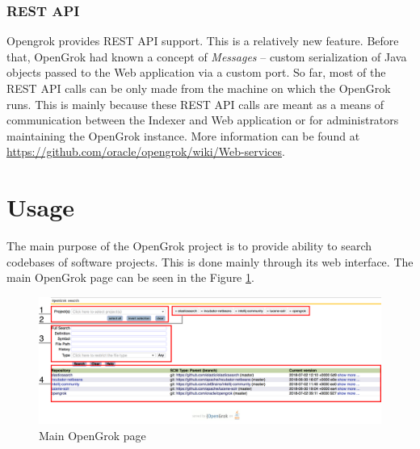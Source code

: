 \subsubsection{REST API}
\label{opengrok_rest}

Opengrok provides REST API support. This is a relatively new feature. Before that, OpenGrok had known a concept of
\textit{Messages} – custom serialization of Java objects passed to the Web application via a custom port.
So far, most of the REST API calls can be only made from the machine on which the OpenGrok runs.
This is mainly because these REST API calls are meant as a means of communication between the Indexer and Web application
or for administrators maintaining the OpenGrok instance. More information can be found at
\url{https://github.com/oracle/opengrok/wiki/Web-services}.

\section{Usage}
\label{opengrok_usage}
The main purpose of the OpenGrok project is to provide ability to search codebases of software projects. This is done
mainly through its web interface. The main OpenGrok page can be seen in the Figure \ref{opengrok_main}.

\begin{figure}[htbp]
    \centering
    \includegraphics[width=145mm]{../img/opengrok_main.png}
    \caption{Main OpenGrok page}
    \label{opengrok_main}
\end{figure}

